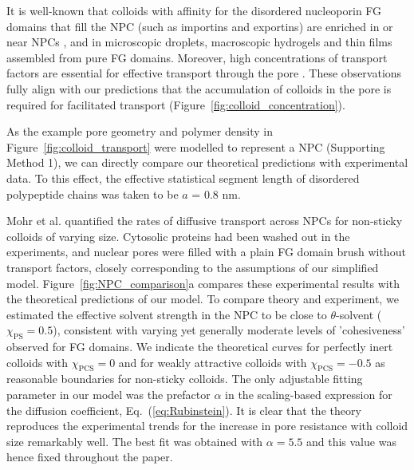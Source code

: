 \documentclass[12pt, a4paper]{article}
\begin{document}
It is well-known that colloids with affinity for the disordered nucleoporin FG domains that fill the NPC (such as importins and exportins) are enriched in or near NPCs \cite{Beck2007, Gruenwald2010, Tu2011}, and in microscopic droplets, macroscopic hydrogels and thin films assembled from pure FG domains.
Moreover, high concentrations of transport factors are essential for effective transport through the pore \cite{Lowe2015}.
These observations fully align with our predictions that the accumulation of colloids in the pore is required for facilitated transport (Figure~\ref{fig:colloid_concentration}).

As the example pore geometry and polymer density in Figure~\ref{fig:colloid_transport} were modelled to represent a NPC (Supporting Method 1), we can directly compare our theoretical predictions with experimental data. To this effect, the effective statistical segment length of disordered polypeptide chains was taken to be $a$ = 0.8 nm. 

Mohr et al. quantified the rates of diffusive transport across NPCs for non-sticky colloids of varying size.
Cytosolic proteins had been washed out in the experiments, and nuclear pores were filled with a plain FG domain brush without transport factors, closely corresponding to the assumptions of our simplified model.
Figure~\ref{fig:NPC_comparison}a compares these experimental results with the theoretical predictions of our model.
To compare theory and experiment, we estimated the effective solvent strength in the NPC to be close to $\theta$-solvent ($\chi_{\text{PS}} = 0.5$), consistent with varying yet generally moderate levels of 'cohesiveness' observed for FG domains.
We indicate the theoretical curves for perfectly inert colloids with $\chi_{\text{PCS}} = 0$ and for weakly attractive colloids with $\chi_{\text{PCS}} = -0.5$ as reasonable boundaries for non-sticky colloids. 
The only adjustable fitting parameter in our model was the prefactor $\alpha$ in the scaling-based expression for the diffusion coefficient, Eq.~(\ref{eq:Rubinstein}).
It is clear that the theory reproduces the experimental trends for the increase in pore resistance with colloid size remarkably well.
The best fit was obtained with $\alpha = 5.5$ and this value was hence fixed  throughout the paper.
\end{document}
